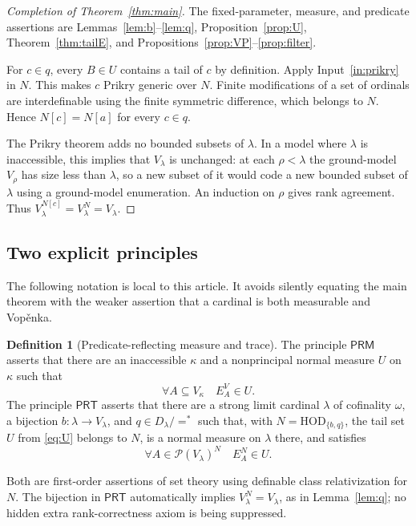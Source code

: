 \documentclass[11pt,letterpaper]{article}
\theoremstyle{definition}
\newtheorem{definition}{Definition}[section]
\numberwithin{equation}{section}
\newcommand{\HOD}{\mathrm{HOD}}
\newcommand{\Pow}{\mathcal P}
\newcommand{\PRM}{\mathsf{PRM}}
\newcommand{\PRT}{\mathsf{PRT}}
\newcommand{\Vop}{Vop\v{e}nka}
\newcommand{\Ncore}{\HOD_{\{b,q\}}}
\begin{document}
\begin{proof}[Completion of Theorem~\ref{thm:main}]
The fixed-parameter, measure, and predicate assertions are Lemmas~\ref{lem:b}--\ref{lem:q}, Proposition~\ref{prop:U}, Theorem~\ref{thm:tailE}, and Propositions~\ref{prop:VP}--\ref{prop:filter}.

For $c\in q$, every $B\in U$ contains a tail of $c$ by definition. Apply Input~\ref{in:prikry} in $N$. This makes $c$ Prikry generic over $N$. Finite modifications of a set of ordinals are interdefinable using the finite symmetric difference, which belongs to $N$. Hence $N[c]=N[a]$ for every $c\in q$.

The Prikry theorem adds no bounded subsets of $\lambda$. In a model where $\lambda$ is inaccessible, this implies that $V_\lambda$ is unchanged: at each $\rho<\lambda$ the ground-model $V_\rho$ has size less than $\lambda$, so a new subset of it would code a new bounded subset of $\lambda$ using a ground-model enumeration. An induction on $\rho$ gives rank agreement. Thus $V_\lambda^{N[c]}=V_\lambda^N=V_\lambda$.
\end{proof}

\subsection{Two explicit principles}

The following notation is local to this article. It avoids silently equating the main theorem with the weaker assertion that a cardinal is both measurable and \Vop.

\begin{definition}[Predicate-reflecting measure and trace]\label{def:principles}
The principle $\PRM$ asserts that there are an inaccessible $\kappa$ and a nonprincipal normal measure $U$ on $\kappa$ such that
\[
 \forall A\subseteq V_\kappa\quad E_A^V\in U.
\]
The principle $\PRT$ asserts that there are a strong limit cardinal $\lambda$ of cofinality $\omega$, a bijection $b:\lambda\to V_\lambda$, and $q\in D_\lambda/{=^*}$ such that, with $N=\Ncore$, the tail set $U$ from \eqref{eq:U} belongs to $N$, is a normal measure on $\lambda$ there, and satisfies
\[
 \forall A\in\Pow(V_\lambda)^N\quad E_A^N\in U.
\]
\end{definition}

Both are first-order assertions of set theory using definable class relativization for $N$. The bijection in $\PRT$ automatically implies $V_\lambda^N=V_\lambda$, as in Lemma~\ref{lem:q}; no hidden extra rank-correctness axiom is being suppressed.
\end{document}
